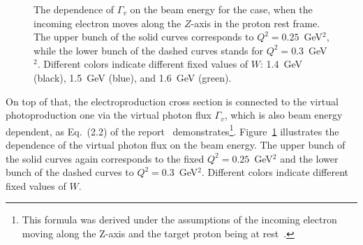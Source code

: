 \begin{figure}[!ht]
\begin{center}
\end{center}
\caption{\small  The dependence of $\Gamma_{v}$ on the beam energy for the case, when the incoming electron moves along the $Z$-axis in the proton rest frame. The upper bunch of the solid curves corresponds to $Q^{2} = 0.25$~GeV$^2$, while the lower bunch of the dashed curves stands for $Q^{2} = 0.3$~GeV$^2$. Different colors indicate different fixed values of $W$: 1.4~GeV (black), 1.5~GeV (blue), and 1.6~GeV (green). }
\label{fig:flux_dep_ebeam}
\end{figure}

\clearpage




On top of that, the electroproduction cross section is connected to the virtual photoproduction one via the virtual photon flux $\Gamma_{v}$,  which is also beam energy dependent, as Eq.~(2.2) of the report~\cite{twopeg} demonstrates\footnote[8]{This formula was derived under the assumptions of the incoming electron moving along the Z-axis and the target proton being at rest~\cite{Skorodumina:2016pnb}. }. Figure~\ref{fig:flux_dep_ebeam} illustrates the dependence of the virtual photon flux on the beam energy. The upper bunch of the solid curves again corresponds to the fixed $Q^{2} = 0.25$~GeV$^2$ and the lower bunch of the dashed curves to  $Q^{2} = 0.3$~GeV$^2$. Different colors indicate different fixed values of $W$.



